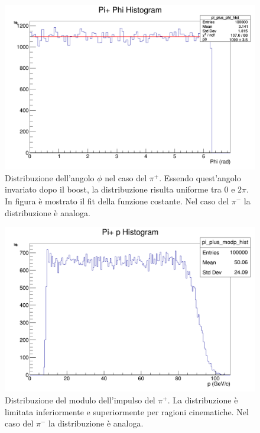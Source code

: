 \documentclass[8pt]{extarticle}
\begin{document}
\begin{figure}
	\begin{center}
		\includegraphics[scale=0.3]{gen_phi} 
		\caption{Distribuzione dell'angolo $\phi$ nel caso del $\pi^+$. Essendo quest'angolo invariato dopo il boost, la distribuzione risulta uniforme tra $0$ e $2\pi$. In figura è mostrato il fit della funzione costante. Nel caso del $\pi^-$ la distribuzione è analoga.}
		\label{fig:gen_phi}
	\end{center}
\end{figure}

\begin{figure}
	\begin{center}
		\includegraphics[scale=0.3]{gen_p} 
		\caption{Distribuzione del modulo dell'impulso del $\pi^+$. La distribuzione è limitata inferiormente e superiormente per ragioni cinematiche. Nel caso del $\pi^-$ la distribuzione è analoga.}
		\label{fig:gen_p}
	\end{center}
\end{figure}
\end{document}
